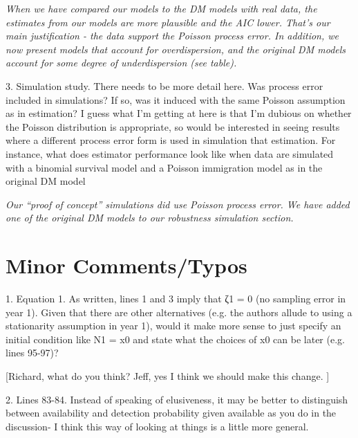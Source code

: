 \documentclass[12pt,english]{article}
\begin{document}
\begin{spacing}{1.9}
\begin{flushleft}
\textit{When we have compared our models to the DM models with real data, the estimates from our models
are more plausible and the AIC lower.  That's our main justification - the data support the Poisson process error.
In addition, we now present models that account for overdispersion, and the original DM models account for
some degree of underdispersion (see table).}

3. Simulation study. There needs to be more detail here. Was process error included in simulations? If so, was it 
induced with the same Poisson assumption as in estimation? I guess what I'm getting at here is that I'm dubious 
on whether the Poisson distribution is appropriate, so would be interested in seeing results where a different process 
error form is used in simulation that estimation. For instance, what does estimator performance look like when data 
are simulated with a binomial survival model and a Poisson immigration model as in the original DM model

\textit{Our ``proof of concept'' simulations did use Poisson process error.  We have added one of the original DM
models to our robustness simulation section.}

\section*{Minor Comments/Typos}
1. Equation 1. As written, lines 1 and 3 imply that ζ1 = 0 (no sampling error in year 1). Given that there are 
other alternatives (e.g. the authors allude to using a stationarity assumption in year 1), would it make more 
sense to just specify an initial condition like N1 = x0 and state what the choices of x0 can be later (e.g. lines 95-97)?

[Richard, what do you think?   Jeff, yes I think we should make this change. ]

2. Lines 83-84. Instead of speaking of elusiveness, it may be better to distinguish between availability 
and detection probability given available as you do in the discussion- I think this way of looking at things is a little more general.


\end{flushleft}
\end{spacing}
\end{document}
